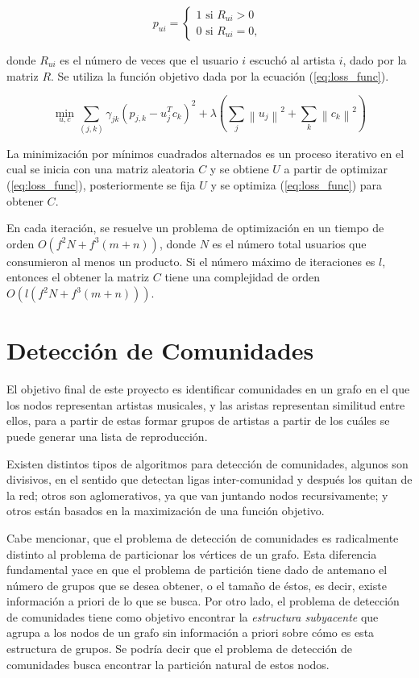 \documentclass[conference]{IEEEtran}
\newcommand{\norm}[1]{\left\lVert#1\right\rVert}
\begin{document}
\[   
p_{ui} = 
     \begin{cases}
       1 \text{ si } R_{ui} > 0 \\
       0 \text{ si } R_{ui} = 0, \
     \end{cases}
\]

donde $R_{ui}$ es el número de veces que el usuario $i$ escuchó al artista $i$, dado por la matriz $R$.
Se utiliza la función objetivo dada por la ecuación (\ref{eq:loss_func}).

\begin{equation}
    \label{eq:loss_func}
    \min_{u, c} \sum_{(j, k)} \gamma_{jk} \left( p_{j, k} - u_j^T c_k \right)^2 + \lambda \left( \sum_j \norm{u_j}^2 + \sum_k \norm{c_k}^2 \right) 
\end{equation}



La minimización por mínimos cuadrados alternados es un proceso iterativo en el cual se inicia con una matriz aleatoria $C$ y se obtiene $U$ a partir de optimizar (\ref{eq:loss_func}), posteriormente se fija $U$ y se optimiza (\ref{eq:loss_func}) para obtener $C$.

En cada iteración, se resuelve un problema de optimización en un tiempo de orden $O(f^2N + f^3 (m + n))$, donde $N$ es el número total usuarios que consumieron al menos un producto. Si el número máximo de iteraciones es $l$, entonces el obtener la matriz $C$ tiene una complejidad de orden $O(l (f^2N + f^3 (m + n)))$.



\section{Detección de Comunidades}

 
El objetivo final de este proyecto es identificar comunidades en un grafo en el que los nodos representan artistas musicales, y las aristas representan similitud entre ellos, para a partir de estas formar grupos de artistas a partir de los cuáles se puede generar una lista de reproducción.

Existen distintos tipos de algoritmos para detección de comunidades, algunos son divisivos, en el sentido que detectan ligas inter-comunidad y después los quitan de la red; otros son aglomerativos, ya que van juntando nodos recursivamente; y otros están basados en la maximización de una función objetivo.

Cabe mencionar, que el problema de detección de comunidades es radicalmente distinto al problema de particionar los vértices de un grafo. Esta diferencia fundamental yace en que el problema de partición tiene dado de antemano el número de grupos que se desea obtener, o el tamaño de éstos, es decir, existe información a priori de lo que se busca. Por otro lado, el problema de detección de comunidades tiene como objetivo encontrar la \textit{estructura subyacente} que agrupa a los nodos de un grafo sin información a priori sobre cómo es esta estructura de grupos. Se podría decir que el problema de detección de comunidades busca encontrar la partición natural de estos nodos.
\end{document}
